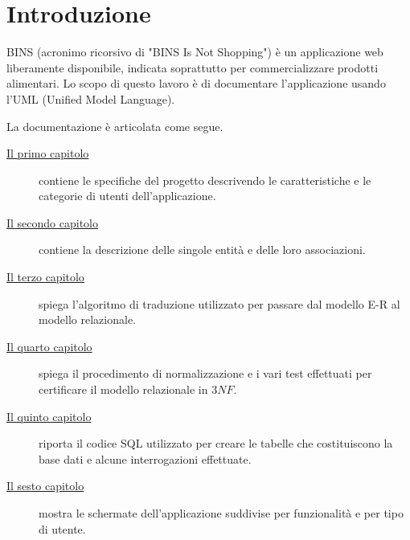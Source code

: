 
\cleardoublepage
{}

\chapter*{Introduzione}

BINS (acronimo ricorsivo di "BINS Is Not Shopping") è un applicazione web liberamente disponibile, indicata soprattutto per commercializzare prodotti alimentari. Lo scopo di questo lavoro è di documentare l'applicazione usando l'UML (Unified Model Language).

La documentazione è articolata come segue.

\begin{description}
	
	\item[{\hyperref[cap:specifiche-progetto]{Il primo capitolo}}]
	contiene le specifiche del progetto descrivendo le caratteristiche e le categorie di utenti dell'applicazione.
	
	\item[{\hyperref[cap:diagramma]{Il secondo capitolo}}]
	contiene la descrizione delle singole entità e delle loro associazioni.
	
	\item[{\hyperref[cap:modello-relazionale]{Il terzo capitolo}}]
	spiega l'algoritmo di traduzione utilizzato per passare dal modello E-R al modello relazionale.
	
	\item[{\hyperref[cap:normalizzazione]{Il quarto capitolo}}]
	spiega il procedimento di normalizzazione e i vari test effettuati per certificare il modello relazionale in $3NF$.
	
	\item[{\hyperref[cap:codice-SQL]{Il quinto capitolo}}]
	riporta il codice SQL utilizzato per creare le tabelle che costituiscono la base dati e alcune interrogazioni effettuate.
	
	\item[{\hyperref[cap:interfaccia-grafica]{Il sesto capitolo}}]
	mostra le schermate dell'applicazione suddivise per funzionalità e per tipo di utente.
	
\end{description}

